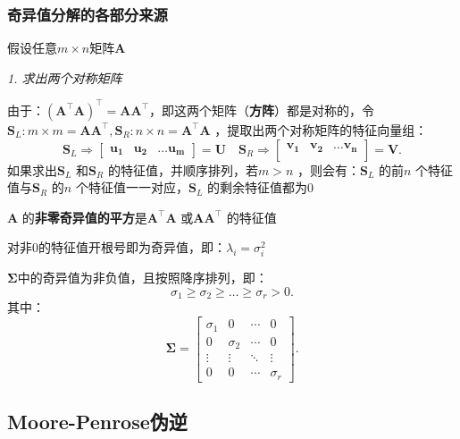 \subsubsection*{奇异值分解的各部分来源}%
\label{subsub:奇异值分解的各部分来源}
假设任意$m\times n$矩阵$\bm{A}$

\textit{1. 求出两个对称矩阵}

由于：$\left( \bm{A}^\top \bm{A} \right)^\top =\bm{A}\bm{A}^\top $，即这两个矩阵（\textbf{方阵}）都是对称的，令$\bm{S}_L:m\times m=\bm{A}\bm{A}^\top ,\bm{S}_R:n\times n=\bm{A}^\top \bm{A}$ ，提取出两个对称矩阵的特征向量组：\[
    \bm{S}_L\Rightarrow \begin{bmatrix}
        \bm{u_1} & \bm{u_2} & \ldots \bm{u_{m}}
    \end{bmatrix}=\bm{U}\quad \bm{S}_R \Rightarrow \begin{bmatrix}
        \bm{v_1} & \bm{v_2} & \ldots \bm{v_{n}}\\
    \end{bmatrix}=\bm{V}
.\]
如果求出$\bm{S}_L$ 和$\bm{S}_R$ 的特征值，并顺序排列，若$m>n$ ，则会有：$\bm{S}_L$ 的前$n$ 个特征值与$\bm{S}_R$ 的$n$ 个特征值一一对应，$\bm{S}_L$ 的剩余特征值都为0
\begin{notation}
    $\bm{A}$ 的\textbf{非零奇异值的平方}是$\bm{A}^\top \bm{A}$ 或$\bm{A}\bm{A}^\top $ 的特征值
\end{notation}
对非0的特征值开根号即为奇异值，即：$\lambda_{i}=\sigma_{i}^2 $
\begin{notation}
    $\bm{\Sigma}$中的奇异值为非负值，且按照降序排列，即： \[
        \sigma_1\ge \sigma_2\ge \ldots \ge \sigma_{r}>0
    .\]
    其中：\[
        \bm{\Sigma} = \begin{bmatrix}
            \sigma_1 & 0 & \cdots & 0\\
            0 & \sigma_2 & \cdots & 0\\
            \vdots & \vdots & \ddots & \vdots \\
            0 & 0 & \cdots & \sigma_{r}
        \end{bmatrix}
    .\]
\end{notation}
\subsection{Moore-Penrose伪逆}%
\label{sub:Moore-Penrose伪逆}

